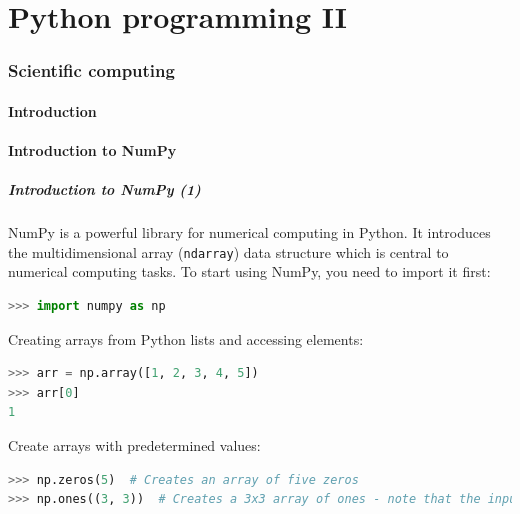 \part{Python programming II}

\section{Scientific computing}
\subsection{Introduction}

\subsection{Introduction to NumPy}
\begin{frame}[fragile]
  \frametitle{Introduction to NumPy (1)}
  NumPy is a powerful library for numerical computing in Python. It introduces the multidimensional array (\lstinline|ndarray|) data structure which is central to numerical computing tasks. To start using NumPy, you need to import it first:
  \begin{lstlisting}[language=Python, numbers=none]
>>> import numpy as np
  \end{lstlisting}\pause
  Creating arrays from Python lists and accessing elements:
  \begin{lstlisting}[language=Python, numbers=none]
>>> arr = np.array([1, 2, 3, 4, 5])
>>> arr[0]
1
  \end{lstlisting}\pause
  Create arrays with predetermined values:
  \begin{lstlisting}[language=Python, numbers=none]
>>> np.zeros(5)  # Creates an array of five zeros
>>> np.ones((3, 3))  # Creates a 3x3 array of ones - note that the input argument is a tuple
  \end{lstlisting}
\end{frame}


